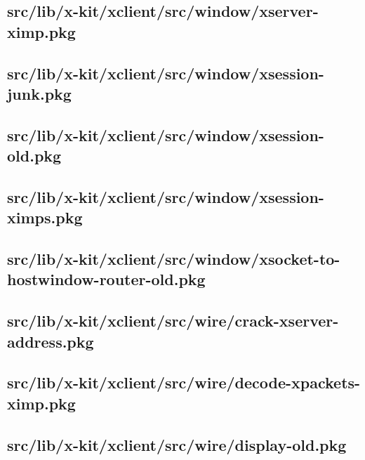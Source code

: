 \subsection{src/lib/x-kit/xclient/src/window/xserver-ximp.pkg}


\subsection{src/lib/x-kit/xclient/src/window/xsession-junk.pkg}


\subsection{src/lib/x-kit/xclient/src/window/xsession-old.pkg}


\subsection{src/lib/x-kit/xclient/src/window/xsession-ximps.pkg}


\subsection{src/lib/x-kit/xclient/src/window/xsocket-to-hostwindow-router-old.pkg}


\subsection{src/lib/x-kit/xclient/src/wire/crack-xserver-address.pkg}


\subsection{src/lib/x-kit/xclient/src/wire/decode-xpackets-ximp.pkg}


\subsection{src/lib/x-kit/xclient/src/wire/display-old.pkg}


